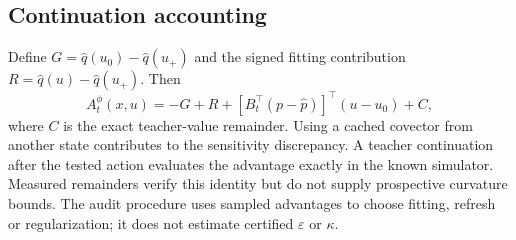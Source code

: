 \subsection{Continuation accounting}
Define $G=\widehat q(u_0)-\widehat q(u_+)$ and the signed fitting
contribution $R=\widehat q(u)-\widehat q(u_+)$. Then
\begin{equation}\label{eq:impact-accounting}
 A_t^\phi(x,u)=-G+R+
 [B_t^\top(p-\widehat p)]^\top(u-u_0)+C,
\end{equation}
where $C$ is the exact teacher-value remainder. Using a cached covector
from another state contributes to the sensitivity discrepancy. A
teacher continuation after the tested action evaluates the advantage
exactly in the known simulator. Measured remainders verify this identity
but do not supply prospective curvature bounds. The audit procedure
uses sampled advantages to choose fitting, refresh or regularization;
it does not estimate certified $\varepsilon$ or $\kappa$.
